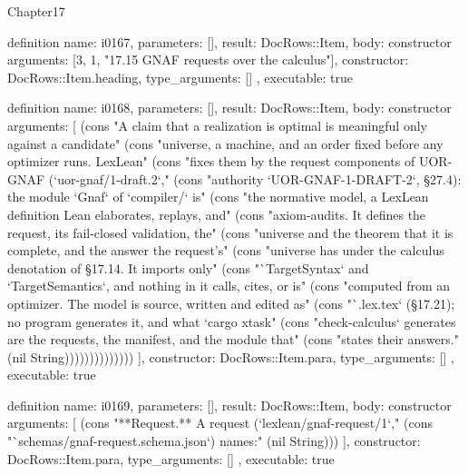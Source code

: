 \begin{lexlean}{Chapter17}
\begin{semanticmodule}
definition{
  name: i0167,
  parameters: [],
  result: DocRows::Item,
  body: constructor{
    arguments: [3, 1, "17.15 GNAF requests over the calculus"],
    constructor: DocRows::Item.heading,
    type_arguments: []
  },
  executable: true
}

definition{
  name: i0168,
  parameters: [],
  result: DocRows::Item,
  body: constructor{
    arguments: [
      (cons "A claim that a realization is optimal is meaningful only against a candidate" (cons "universe, a machine, and an order fixed before any optimizer runs. LexLean" (cons "fixes them by the request components of UOR-GNAF (`uor-gnaf/1-draft.2`," (cons "authority `UOR-GNAF-1-DRAFT-2`, §27.4): the module `Gnaf` of `compiler/` is" (cons "the normative model, a LexLean definition Lean elaborates, replays, and" (cons "axiom-audits. It defines the request, its fail-closed validation, the" (cons "universe and the theorem that it is complete, and the answer the request's" (cons "universe has under the calculus denotation of §17.14. It imports only" (cons "`TargetSyntax` and `TargetSemantics`, and nothing in it calls, cites, or is" (cons "computed from an optimizer. The model is source, written and edited as" (cons "`.lex.tex` (§17.21); no program generates it, and what `cargo xtask" (cons "check-calculus` generates are the requests, the manifest, and the module that" (cons "states their answers." (nil String))))))))))))))
    ],
    constructor: DocRows::Item.para,
    type_arguments: []
  },
  executable: true
}

definition{
  name: i0169,
  parameters: [],
  result: DocRows::Item,
  body: constructor{
    arguments: [
      (cons "**Request.** A request (`lexlean/gnaf-request/1`," (cons "`schemas/gnaf-request.schema.json`) names:" (nil String)))
    ],
    constructor: DocRows::Item.para,
    type_arguments: []
  },
  executable: true
}


\end{semanticmodule}
\end{lexlean}
